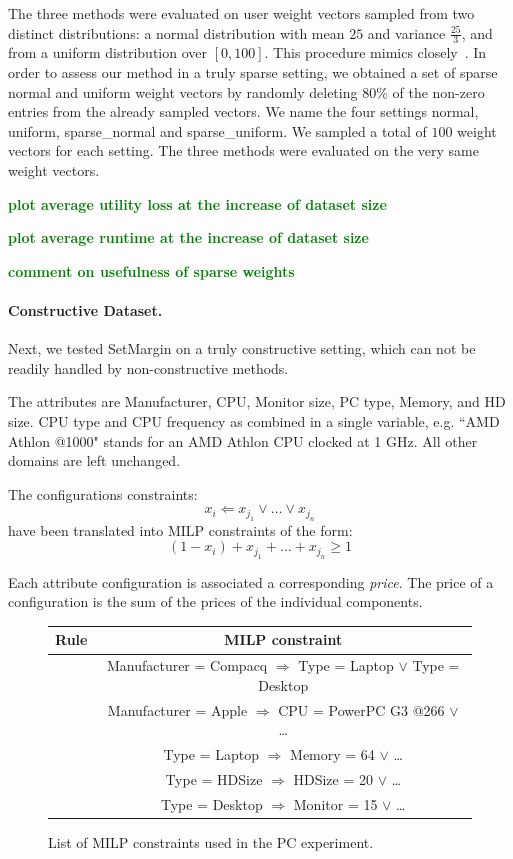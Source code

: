 \documentclass{article}
\renewcommand\[{\begin{equation}}
\renewcommand\]{\end{equation}}
\newcommand{\stefano}[1]{{\bf \textcolor{green}{{\fbox{Stefano:} #1}}}}
\begin{document}
The three methods were evaluated on user weight vectors sampled from two
distinct distributions: a normal distribution with mean $25$ and
variance $\frac{25}{3}$, and from a uniform distribution over $[0,
100]$. This procedure mimics closely~\cite{guo2010real}. In order to assess our
method in a truly sparse setting, we obtained a set of sparse normal and
uniform weight vectors by randomly deleting $80\%$ of the non-zero entries from
the already sampled vectors. We name the four settings {\sc normal}, {\sc
uniform}, {\sc sparse\_normal} and {\sc sparse\_uniform}. We sampled a total
of $100$ weight vectors for each setting. The three methods were evaluated
on the very same weight vectors.

\stefano{plot average utility loss at the increase of dataset size}

\stefano{plot average runtime at the increase of dataset size}

\stefano{comment on usefulness of sparse weights}

\paragraph{Constructive Dataset.} Next, we tested {\sc SetMargin} on a truly
constructive setting, which can not be readily handled by non-constructive
methods.

The attributes are Manufacturer, CPU, Monitor size, PC type, Memory, and HD
size. CPU type and CPU frequency as combined in a single variable, e.g. ``AMD
Athlon @1000" stands for an AMD Athlon CPU clocked at 1 GHz. All other domains
are left unchanged.

The configurations constraints:
%
$$ x_i \Leftarrow x_{j_1} \lor \ldots \lor x_{j_n} $$
%
have been translated into MILP constraints of the form:
%
$$ (1 - x_i) + x_{j_1} + \ldots + x_{j_n} \ge 1 $$

Each attribute configuration is associated a corresponding {\em price}. The
price of a configuration is the sum of the prices of the individual components.

\begin{figure}
    {\footnotesize
    \begin{tabular}{cc}
        {\bf Rule} & {\bf MILP constraint} \\ \hline\hline
        & Manufacturer = Compacq $\Rightarrow$ Type = Laptop $\lor$ Type = Desktop \\
        & Manufacturer = Apple $\Rightarrow$ CPU = PowerPC G3 @266 $\lor$ \ldots \\
        & Type = Laptop $\Rightarrow$ Memory = 64 $\lor$ \ldots \\
        & Type = HDSize $\Rightarrow$ HDSize = 20 $\lor$ \ldots \\
        & Type = Desktop $\Rightarrow$ Monitor = 15 $\lor$ \ldots \\
    \end{tabular}
    }
    \caption{\label{tab:pcconstraints} List of MILP constraints used in the
    PC experiment.}
\end{figure}
\end{document}
